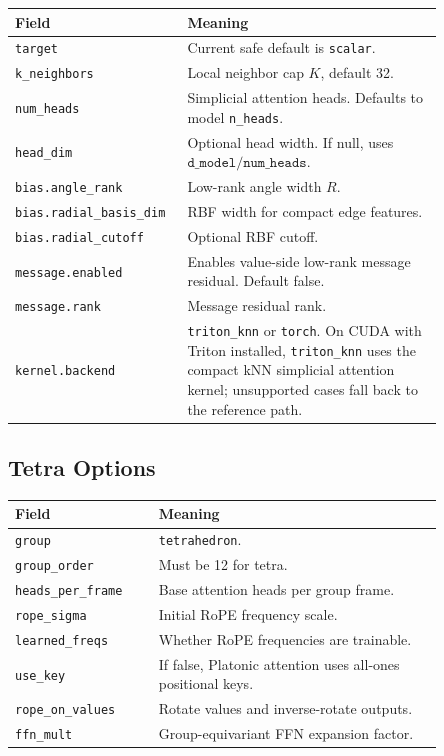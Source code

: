 \documentclass[11pt]{article}
\begin{document}
\begin{center}
\begin{tabular}{p{0.29\linewidth}p{0.56\linewidth}}
\toprule
Field & Meaning \\
\midrule
\texttt{target} & Current safe default is \texttt{scalar}. \\
\texttt{k\_neighbors} & Local neighbor cap \(K\), default 32. \\
\texttt{num\_heads} & Simplicial attention heads. Defaults to model \texttt{n\_heads}. \\
\texttt{head\_dim} & Optional head width. If null, uses \(\texttt{d\_model}/\texttt{num\_heads}\). \\
\texttt{bias.angle\_rank} & Low-rank angle width \(R\). \\
\texttt{bias.radial\_basis\_dim} & RBF width for compact edge features. \\
\texttt{bias.radial\_cutoff} & Optional RBF cutoff. \\
\texttt{message.enabled} & Enables value-side low-rank message residual. Default false. \\
\texttt{message.rank} & Message residual rank. \\
\texttt{kernel.backend} & \texttt{triton\_knn} or \texttt{torch}. On CUDA with Triton installed, \texttt{triton\_knn} uses the compact kNN simplicial attention kernel; unsupported cases fall back to the reference path. \\
\bottomrule
\end{tabular}
\end{center}

\subsection{Tetra Options}

\begin{center}
\begin{tabular}{p{0.29\linewidth}p{0.56\linewidth}}
\toprule
Field & Meaning \\
\midrule
\texttt{group} & \texttt{tetrahedron}. \\
\texttt{group\_order} & Must be 12 for tetra. \\
\texttt{heads\_per\_frame} & Base attention heads per group frame. \\
\texttt{rope\_sigma} & Initial RoPE frequency scale. \\
\texttt{learned\_freqs} & Whether RoPE frequencies are trainable. \\
\texttt{use\_key} & If false, Platonic attention uses all-ones positional keys. \\
\texttt{rope\_on\_values} & Rotate values and inverse-rotate outputs. \\
\texttt{ffn\_mult} & Group-equivariant FFN expansion factor. \\
\bottomrule
\end{tabular}
\end{center}
\end{document}
